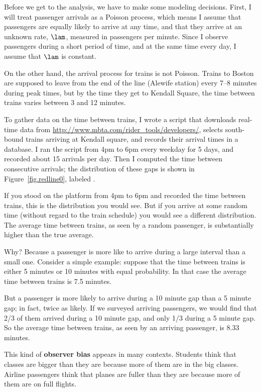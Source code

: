 \documentclass[12pt]{book}
\theoremstyle{exercise}
\begin{document}
Before we get to the analysis, we have to make some
modeling decisions.  First, I will treat passenger arrivals as
a Poisson process, which means I assume that passengers are equally
likely to arrive at any time, and that they arrive at an unknown
rate, $\lam$, measured in passengers per minute.  Since I
observe passengers during a short period of time, and at the same
time every day, I assume that $\lam$ is constant.

On the other hand, the arrival process for trains is not Poisson.
Trains to Boston are supposed to leave from the end of the line
(Alewife station) every 7--8 minutes during peak times, but by the time
they get to Kendall Square, the time between trains varies between 3
and 12 minutes.

To gather data on the time between trains, I wrote a script that
downloads real-time data from
\url{http://www.mbta.com/rider_tools/developers/}, selects south-bound
trains arriving at Kendall square, and records their arrival times
in a database.  I ran the script from 4pm to 6pm every weekday
for 5 days, and recorded about 15 arrivals per day.  Then
I computed the time between consecutive arrivals; the distribution
of these gaps is shown in Figure~\ref{fig.redline0}, labeled .

If you stood on the platform from 4pm to 6pm and recorded the time
between trains, this is the distribution you would see.  But if you
arrive at some random time (without regard to the train schedule) you
would see a different distribution.  The average time
between trains, as seen by a random passenger, is substantially
higher than the true average.

Why?  Because a passenger is more like to arrive during a
large interval than a small one.  Consider a simple example:
suppose that the time between trains is either 5 minutes
or 10 minutes with equal probability.  In that case
the average time between
trains is 7.5 minutes.

But a passenger is more likely to arrive during a 10 minute gap 
than a 5 minute gap; in fact, twice as likely.  If we surveyed
arriving passengers, we would find that 2/3 of them arrived during
a 10 minute gap, and only 1/3 during a 5 minute gap.  So the
average time between trains, as seen by an arriving passenger,
is 8.33 minutes.

This kind of {\bf observer bias} appears in many contexts.  Students
think that classes are bigger than they are because more of them are
in the big classes.  Airline passengers think that planes are fuller
than they are because more of them are on full flights.
\end{document}
